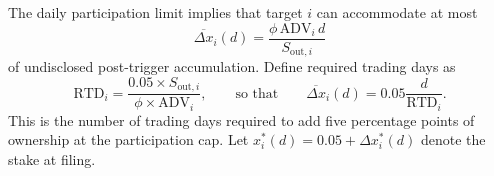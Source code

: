 The daily participation limit implies that target $i$ can accommodate at most
\begin{equation}
\overline{\Delta x}_i(d)
=\frac{\phi\,\mathrm{ADV}_i\,d}{S_{\mathrm{out},i}}
\label{eq:cap}
\end{equation}
of undisclosed post-trigger accumulation. Define required trading days as
\begin{equation}
\mathrm{RTD}_i
=\frac{0.05\times S_{\mathrm{out},i}}
       {\phi\times\mathrm{ADV}_i},
\qquad\text{so that}\qquad
\overline{\Delta x}_i(d)=0.05\frac{d}{\mathrm{RTD}_i}.
\label{eq:rtd}
\end{equation}
This is the number of trading days required to add five percentage points of
ownership at the participation cap. Let
$x_i^\ast(d)=0.05+\Delta x_i^\ast(d)$ denote the stake at filing.

